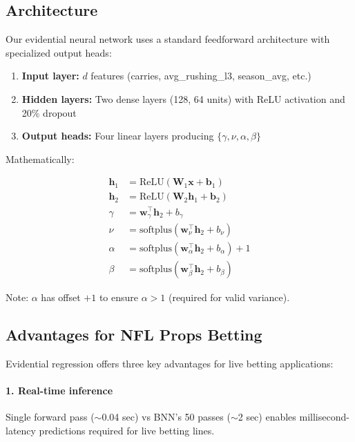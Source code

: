 \subsection{Architecture}

Our evidential neural network uses a standard feedforward architecture with specialized output heads:

\begin{enumerate}[nosep]
    \item \textbf{Input layer:} $d$ features (carries, avg\_rushing\_l3, season\_avg, etc.)
    \item \textbf{Hidden layers:} Two dense layers (128, 64 units) with ReLU activation and 20\% dropout
    \item \textbf{Output heads:} Four linear layers producing $\{\gamma, \nu, \alpha, \beta\}$
\end{enumerate}

\noindent Mathematically:

\begin{align}
    \mathbf{h}_1 &= \text{ReLU}(\mathbf{W}_1 \mathbf{x} + \mathbf{b}_1) \\
    \mathbf{h}_2 &= \text{ReLU}(\mathbf{W}_2 \mathbf{h}_1 + \mathbf{b}_2) \\
    \gamma &= \mathbf{w}_\gamma^\top \mathbf{h}_2 + b_\gamma \\
    \nu &= \text{softplus}(\mathbf{w}_\nu^\top \mathbf{h}_2 + b_\nu) \\
    \alpha &= \text{softplus}(\mathbf{w}_\alpha^\top \mathbf{h}_2 + b_\alpha) + 1 \\
    \beta &= \text{softplus}(\mathbf{w}_\beta^\top \mathbf{h}_2 + b_\beta)
\end{align}

\noindent Note: $\alpha$ has offset $+1$ to ensure $\alpha > 1$ (required for valid variance).

\subsection{Advantages for NFL Props Betting}

Evidential regression offers three key advantages for live betting applications:

\paragraph{1. Real-time inference} Single forward pass ($\sim$0.04 sec) vs BNN's 50 passes ($\sim$2 sec) enables millisecond-latency predictions required for live betting lines.

